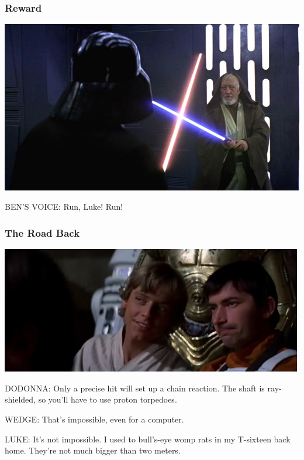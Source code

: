 \documentclass{beamer}
\begin{document}
\begin{frame}\frametitle{Reward}

\includegraphics[width=\textwidth]{obivader.png}

BEN'S VOICE: Run, Luke! Run!



\end{frame}
\begin{frame}\frametitle{The Road Back}

\includegraphics[width=\textwidth]{womprats.png}

DODONNA: Only a precise hit will set up a chain reaction. The shaft is
ray-shielded, so you'll have to use proton torpedoes.

WEDGE: That's impossible, even for a computer.

LUKE: It's not impossible. I used to bull's-eye womp rats in my
T-sixteen back home. They're not much bigger than two meters.

\end{frame}
\end{document}
